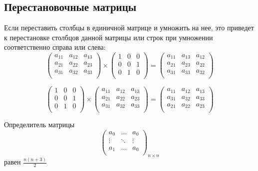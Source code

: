 \documentclass{article}
\begin{document}
\subsection*{Перестановочные матрицы}
Если переставить столбцы в единичной матрице и умножить на нее, это приведет к перестановке столбцов данной матрицы или строк при умножении соответственно справа или слева:
$$\begin{pmatrix}
	a_{11} & a_{12} & a_{13}\\
	a_{21} & a_{22} & a_{23}\\
	a_{31} & a_{32} & a_{33}\\
\end{pmatrix}\times
\begin{pmatrix}
	1 & 0 & 0\\
	0 & 0 & 1\\
	0 & 1 & 0\\
\end{pmatrix} = 
\begin{pmatrix}
    a_{11} & a_{13} & a_{12}\\
	a_{21} & a_{23} & a_{22}\\
	a_{31} & a_{33} & a_{32}\\
\end{pmatrix}
$$

$$\begin{pmatrix}
	1 & 0 & 0\\
	0 & 0 & 1\\
	0 & 1 & 0\\
\end{pmatrix}\times\begin{pmatrix}
	a_{11} & a_{12} & a_{13}\\
	a_{21} & a_{22} & a_{23}\\
	a_{31} & a_{32} & a_{33}\\
\end{pmatrix} = 
\begin{pmatrix}
	a_{11} & a_{12} & a_{13}\\
	a_{31} & a_{32} & a_{33}\\
	a_{21} & a_{22} & a_{23}\\
\end{pmatrix}
$$

Определитель матрицы 
$$\begin{pmatrix}
	a_{0} & \ldots & a_{0}\\
	\vdots & \ddots & \vdots\\
	a_{1} & \ldots & a_{0}\\
\end{pmatrix}_{n\times n}$$
равен $\frac{n(n+3)}2$
\end{document}
